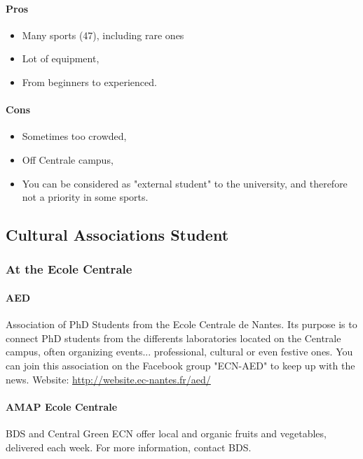 \paragraph{Pros}
\begin{itemize}
  \item Many sports (47), including rare ones
  \item Lot of equipment,
  \item From beginners to experienced.
\end{itemize}

\paragraph{Cons}
\begin{itemize}
  \item Sometimes too crowded,
  \item Off Centrale campus,
  \item You can be considered as "external student" to the university, and therefore not a priority in some sports.
\end{itemize}

\subsection {Cultural Associations Student}
\subsubsection {At the Ecole Centrale}
\paragraph{AED} Association of PhD Students from the Ecole Centrale de Nantes. Its purpose is to connect PhD students from the differents laboratories located on the Centrale campus, often organizing events... professional, cultural or even festive ones.
You can join this association on the Facebook group "ECN-AED" to keep up with the news. Website: \url{http://website.ec-nantes.fr/aed/}
\paragraph{AMAP Ecole Centrale} BDS and Central Green ECN offer local and organic fruits and vegetables, delivered each week. For more information, contact BDS.



